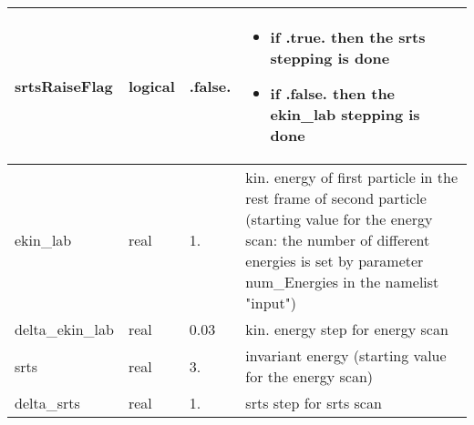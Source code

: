 \documentclass{article}
\begin{document}
\begin{longtable}{llll}
\midrule
srtsRaiseFlag & \begin{minipage}[t]{2cm}logical\end{minipage} & \begin{minipage}[t]{2cm}.false.\end{minipage} & \begin{minipage}[t]{12cm}\begin{itemize}\leftmargin0em\itemindent0pt\item if .true. then the srts stepping is done\item if .false. then the ekin\_lab stepping is done\end{itemize}\end{minipage}\\*
\midrule
ekin\_lab & \begin{minipage}[t]{2cm}real\end{minipage} & \begin{minipage}[t]{2cm}1.\end{minipage} & \begin{minipage}[t]{12cm}kin. energy of first particle in the rest frame of second particle (starting value for the energy scan: the number of different energies is set by parameter num\_Energies in the namelist "input")\end{minipage}\\*
\midrule
delta\_ekin\_lab & \begin{minipage}[t]{2cm}real\end{minipage} & \begin{minipage}[t]{2cm}0.03\end{minipage} & \begin{minipage}[t]{12cm}kin. energy step for energy scan\end{minipage}\\*
\midrule
srts & \begin{minipage}[t]{2cm}real\end{minipage} & \begin{minipage}[t]{2cm}3.\end{minipage} & \begin{minipage}[t]{12cm}invariant energy (starting value for the energy scan)\end{minipage}\\*
\midrule
delta\_srts & \begin{minipage}[t]{2cm}real\end{minipage} & \begin{minipage}[t]{2cm}1.\end{minipage} & \begin{minipage}[t]{12cm}srts step for srts scan\end{minipage}\\*
\bottomrule
\end{longtable}
{ }
\end{document}
